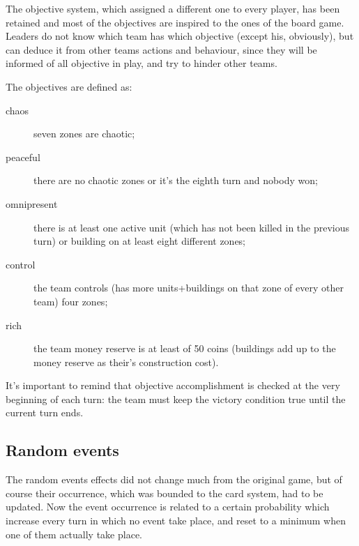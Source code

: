 			The objective system, which assigned a different one to every player, has been retained and most of the objectives are inspired to the ones of the board game. Leaders do not know which team has which objective (except his, obviously), but can deduce it from other teams actions and behaviour, since they will be informed of all objective in play, and try to hinder other teams.
			
			The objectives are defined as:
			\begin{description}
				\item[chaos] seven zones are chaotic;
				\item[peaceful] there are no chaotic zones or it's the eighth turn and nobody won;
				\item[omnipresent] there is at least one active unit (which has not been killed in the previous turn) or building on at least eight different zones;
				\item[control] the team controls (has more units+buildings on that zone of every other team) four zones;
				\item[rich] the team money reserve is at least of 50 coins (buildings add up to the money reserve as their's construction cost).
			\end{description}
			
			It's important to remind that objective accomplishment is checked at the very beginning of each turn: the team must keep the victory condition true until the current turn ends.
			
		\subsection{Random events}
			
			The random events effects did not change much from the original game, but of course their occurrence, which was bounded to the card system, had to be updated. Now the event occurrence is related to a certain probability which increase every turn in which no event take place, and reset to a minimum when one of them actually take place.
			
